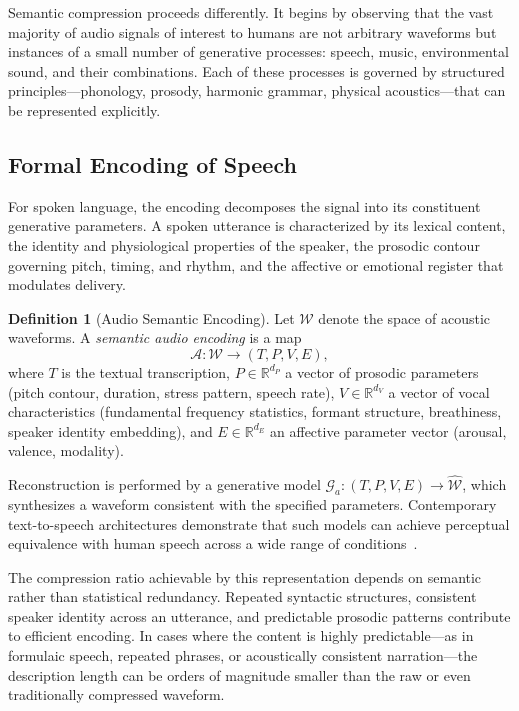 \documentclass[12pt,a4paper]{article}
\theoremstyle{definition}
\newtheorem{definition}[theorem]{Definition}
\theoremstyle{remark}
\begin{document}
Semantic compression proceeds differently. It begins by observing that the vast majority of audio signals of interest to humans are not arbitrary waveforms but instances of a small number of generative processes: speech, music, environmental sound, and their combinations. Each of these processes is governed by structured principles---phonology, prosody, harmonic grammar, physical acoustics---that can be represented explicitly.

\subsection{Formal Encoding of Speech}

For spoken language, the encoding decomposes the signal into its constituent generative parameters. A spoken utterance is characterized by its lexical content, the identity and physiological properties of the speaker, the prosodic contour governing pitch, timing, and rhythm, and the affective or emotional register that modulates delivery.

\begin{definition}[Audio Semantic Encoding]
Let $\mathcal{W}$ denote the space of acoustic waveforms. A \emph{semantic audio encoding} is a map
\[
\mathcal{A} : \mathcal{W} \rightarrow (T, P, V, E),
\]
where $T$ is the textual transcription, $P \in \mathbb{R}^{d_P}$ a vector of prosodic parameters (pitch contour, duration, stress pattern, speech rate), $V \in \mathbb{R}^{d_V}$ a vector of vocal characteristics (fundamental frequency statistics, formant structure, breathiness, speaker identity embedding), and $E \in \mathbb{R}^{d_E}$ an affective parameter vector (arousal, valence, modality).
\end{definition}

Reconstruction is performed by a generative model $\mathcal{G}_a : (T, P, V, E) \rightarrow \widehat{\mathcal{W}}$, which synthesizes a waveform consistent with the specified parameters. Contemporary text-to-speech architectures demonstrate that such models can achieve perceptual equivalence with human speech across a wide range of conditions~\cite{oord}.

The compression ratio achievable by this representation depends on semantic rather than statistical redundancy. Repeated syntactic structures, consistent speaker identity across an utterance, and predictable prosodic patterns contribute to efficient encoding. In cases where the content is highly predictable---as in formulaic speech, repeated phrases, or acoustically consistent narration---the description length can be orders of magnitude smaller than the raw or even traditionally compressed waveform.
\end{document}
